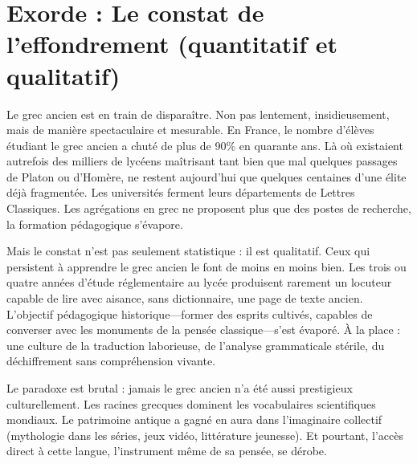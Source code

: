 
\section*{Exorde : Le constat de l'effondrement (quantitatif et qualitatif)}

Le grec ancien est en train de disparaître. Non pas lentement, insidieusement, mais de manière spectaculaire et mesurable. En France, le nombre d'élèves étudiant le grec ancien a chuté de plus de 90\% en quarante ans. Là où existaient autrefois des milliers de lycéens maîtrisant tant bien que mal quelques passages de Platon ou d'Homère, ne restent aujourd'hui que quelques centaines d'une élite déjà fragmentée. Les universités ferment leurs départements de Lettres Classiques. Les agrégations en grec ne proposent plus que des postes de recherche, la formation pédagogique s'évapore.

Mais le constat n'est pas seulement statistique : il est qualitatif. Ceux qui persistent à apprendre le grec ancien le font de moins en moins bien. Les trois ou quatre années d'étude réglementaire au lycée produisent rarement un locuteur capable de lire avec aisance, sans dictionnaire, une page de texte ancien. L'objectif pédagogique historique---former des esprits cultivés, capables de converser avec les monuments de la pensée classique---s'est évaporé. À la place : une culture de la traduction laborieuse, de l'analyse grammaticale stérile, du déchiffrement sans compréhension vivante.

Le paradoxe est brutal : jamais le grec ancien n'a été aussi prestigieux culturellement. Les racines grecques dominent les vocabulaires scientifiques mondiaux. Le patrimoine antique a gagné en aura dans l'imaginaire collectif (mythologie dans les séries, jeux vidéo, littérature jeunesse). Et pourtant, l'accès direct à cette langue, l'instrument même de sa pensée, se dérobe.
